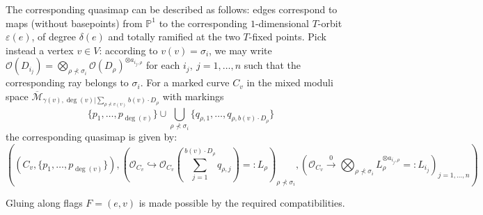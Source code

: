 \documentclass[11pt]{amsart}
\newcommand{\PP}{\mathbb P}
\newcommand{\OO}{\mathcal{O}}
\theoremstyle{definition}
\theoremstyle{definition}
\begin{document}
The corresponding quasimap can be described as follows: edges correspond to maps (without basepoints) from $\PP^1$ to the corresponding $1$-dimensional $T$-orbit $\varepsilon(e)$, of degree $\delta(e)$ and totally ramified at the two $T$-fixed points. Pick instead a vertex $v\in V$: according to $v(v)=\sigma_i$, we may write $\OO(D_{i_j})=\bigotimes_{\rho\nprec\sigma_i} \OO(D_\rho)^{\otimes a_{i_j,\rho}}$ for each $i_j,\ j=1,\ldots,n$ such that the corresponding ray belongs to $\sigma_i$. For a marked curve $C_v$ in the mixed moduli space $\overline{\mathcal M}_{\gamma(v),\deg(v)|\sum_{\rho\nprec v(v)}b(v)\cdot D_\rho}$ with markings
\[
 \{p_1,\ldots,p_{\deg(v)}\}\cup\bigcup_{\rho\nprec\sigma_i}\{q_{\rho,1},\ldots,q_{\rho,b(v)\cdot D_{\rho}}\}
\]
the corresponding quasimap is given by:
\[
 \left((C_v,\{p_1,\ldots,p_{\deg(v)}\}),(\mathcal O_{C_v}\hookrightarrow\OO_{C_v}(\sum_{j=1}^{b(v)\cdot D_{\rho} }q_{\rho,j})=:L_\rho)_{\rho\nprec\sigma_i},(\mathcal O_{C_v}\xrightarrow{0}\bigotimes_{\rho\nprec\sigma_i} L_\rho^{\otimes a_{i_j,\rho}}=:L_{i_j})_{j=1,\ldots,n} \right)
\]

Gluing along flags $F=(e,v)$ is made possible by the required compatibilities.

\appendix




\bigskip\bigskip


\end{document}
